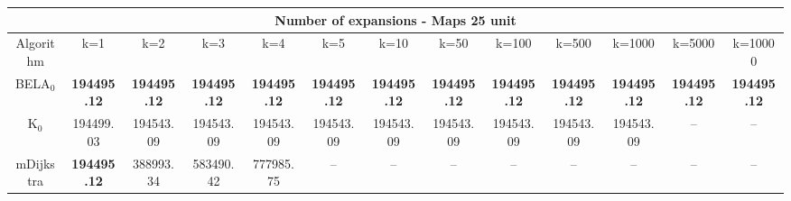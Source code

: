 \begin{tabular}{c|cccccccccccc}\toprule
\multicolumn{13}{c}{Number of expansions - Maps 25 unit}\\ \midrule
Algorithm & k=1 & k=2 & k=3 & k=4 & k=5 & k=10 & k=50 & k=100 & k=500 & k=1000 & k=5000 & k=10000 \\ \midrule
BELA$_0$ & \textbf{194495.12} & \textbf{194495.12} & \textbf{194495.12} & \textbf{194495.12} & \textbf{194495.12} & \textbf{194495.12} & \textbf{194495.12} & \textbf{194495.12} & \textbf{194495.12} & \textbf{194495.12} & \textbf{194495.12} & \textbf{194495.12} \\
K$_0$ & 194499.03 & 194543.09 & 194543.09 & 194543.09 & 194543.09 & 194543.09 & 194543.09 & 194543.09 & 194543.09 & 194543.09 & -- & -- \\
mDijkstra & \textbf{194495.12} & 388993.34 & 583490.42 & 777985.75 & -- & -- & -- & -- & -- & -- & -- & -- \\ \bottomrule 
\end{tabular}
